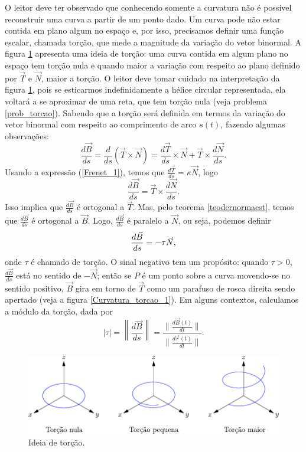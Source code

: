 O leitor deve ter observado que conhecendo somente a curvatura não é possível reconstruir uma curva a partir de um ponto dado. Um curva pode não estar contida em plano algum no espaço e, por isso, precisamos definir uma função escalar, chamada torção, que mede a magnitude da variação do vetor binormal. A figura \ref{torcao} apresenta uma ideia de torção: uma curva contida em algum plano no espaço tem torção nula e quando maior a variação com respeito ao plano definido por $\vec{T}$ e $\vec{N}$, maior a torção. O leitor deve tomar cuidado na interpretação da figura \ref{torcao}, pois se esticarmos indefinidamente a hélice circular representada, ela voltará a se aproximar de uma reta, que tem torção nula (veja problema \ref{prob_torcao}). Sabendo que a torção será definida em termos da variação do vetor binormal com respeito ao comprimento de arco $s(t)$, fazendo algumas observações:
$$
\frac{d\vec{B}}{ds}=\frac{d}{ds}\left(\vec{T}\times\vec{N}\right)=\frac{d\vec{T}}{ds}\times \vec{N}+\vec{T}\times\frac{d\vec{N}}{ds}.
$$
Usando a expressão (\ref{Frenet_1}), temos que $\frac{d\vec{T}}{ds}=\kappa\vec{N}$, logo
$$
\frac{d\vec{B}}{ds}=\vec{T}\times\frac{d\vec{N}}{ds}.
$$
Isso implica que $\frac{d\vec{B}}{ds}$ é ortogonal a $\vec{T}$. Mas, pelo teorema \ref{teodernormacst}, temos que $\frac{d\vec{B}}{ds}$ é ortogonal a $\vec{B}$. Logo, $\frac{d\vec{B}}{ds}$ é paralelo a $\vec{N}$, ou seja, podemos definir
\begin{equation}{\label{Frenet_2}}
\frac{d\vec{B}}{ds}=-\tau\vec{N},
\end{equation}
onde $\tau$ é chamado de torção. O sinal negativo tem um propósito: quando $\tau>0$, $\frac{d\vec{B}}{ds}$ está no sentido de $-\vec{N}$; então se $P$ é um ponto sobre a curva movendo-se no sentido positivo, $\vec{B}$ gira em torno de $\vec{T}$ como um parafuso de rosca direita sendo apertado (veja a figura \ref{Curvatura_torcao_1}). Em alguns contextos, calculamos a módulo da torção, dada por
$$
|\tau|=\left\|\frac{d\vec{B}}{ds}\right\|=\frac{\|\frac{d\vec{B}(t)}{dt}\|}{\|\frac{d\vec{r}(t)}{dt}\|}.
$$


\begin{figure}
\begin{center}
    \includegraphics{./cap_curvas/figs/exemplos_de_torcao}
 \caption{Ideia de torção.}\label{torcao}
  \end{center}
\end{figure}



